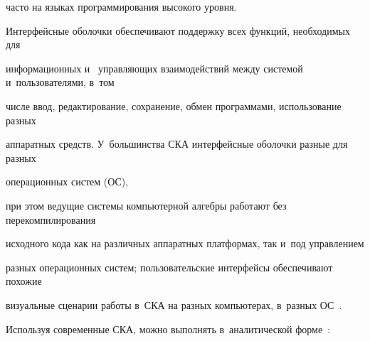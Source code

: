 часто на языках программирования высокого уровня.



Интерфейсные оболочки обеспечивают поддержку всех функций, необходимых для 

информационных и~ управляющих взаимодействий между системой и~пользователями, в~том 

числе ввод, редактирование, сохранение,  обмен  программами, использование разных 

 аппаратных средств. У~большинства СКА интерфейсные оболочки разные для разных 

 операционных систем (ОС), 

 при этом ведущие системы компьютерной алгебры работают без перекомпилирования 

 исходного кода как на различных аппаратных платформах, так и~под управлением 

 разных операционных систем; пользовательские интерфейсы обеспечивают похожие 

 визуальные сценарии работы в~СКА на разных компьютерах, в~разных ОС~\cite{13-sin}.



Используя современные СКА, можно выполнять в~аналитической форме~\cite{13-sin}:


